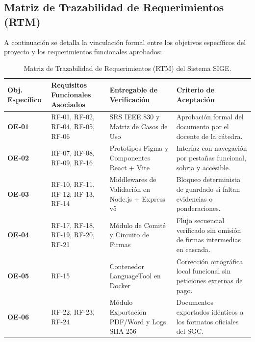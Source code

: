 \documentclass[12pt,a4paper]{article}
\begin{document}
\subsection{Matriz de Trazabilidad de Requerimientos (RTM)}
A continuación se detalla la vinculación formal entre los objetivos específicos del proyecto y los requerimientos funcionales aprobados:

\begin{table}[htbp]
\centering
\small
\begin{tabularx}{\textwidth}{|>{\hsize=0.35\hsize\bfseries\centering\arraybackslash}X|>{\hsize=0.85\hsize}X|>{\hsize=0.9\hsize}X|>{\hsize=0.9\hsize}X|}
    \hline
    \rowcolor{tableheader}
    Obj. Específico & Requisitos Funcionales Asociados & Entregable de Verificación & Criterio de Aceptación \\
    \hline
    \textbf{OE-01} & RF-01, RF-02, RF-04, RF-05, RF-06 & SRS IEEE 830 y Matriz de Casos de Uso & Aprobación formal del documento por el docente de la cátedra. \\
    \hline
    \textbf{OE-02} & RF-07, RF-08, RF-09, RF-16 & Prototipos Figma y Componentes React + Vite & Interfaz con navegación por pestañas funcional, sobria y accesible. \\
    \hline
    \textbf{OE-03} & RF-10, RF-11, RF-12, RF-13, RF-14 & Middlewares de Validación en Node.js + Express v5 & Bloqueo determinista de guardado si faltan evidencias o ponderaciones. \\
    \hline
    \textbf{OE-04} & RF-17, RF-18, RF-19, RF-20, RF-21 & Módulo de Comité y Circuito de Firmas & Flujo secuencial verificado sin omisión de firmas intermedias en cascada. \\
    \hline
    \textbf{OE-05} & RF-15 & Contenedor LanguageTool en Docker & Corrección ortográfica local funcional sin peticiones externas de pago. \\
    \hline
    \textbf{OE-06} & RF-22, RF-23, RF-24 & Módulo Exportación PDF/Word y Logs SHA-256 & Documentos exportados idénticos a los formatos oficiales del SGC. \\
    \hline
\end{tabularx}
\caption{Matriz de Trazabilidad de Requerimientos (RTM) del Sistema SIGE.}
\label{tab:s1_04_rtm}
\end{table}

\vspace{0.3cm}

\end{document}
